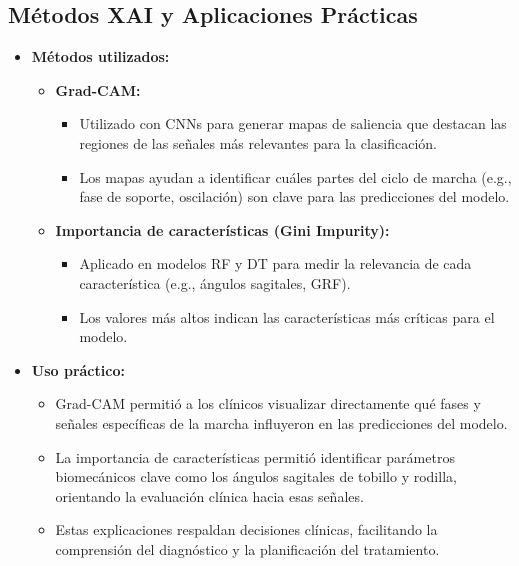 \documentclass{report}
\begin{document}
\subsection{Métodos XAI y Aplicaciones Prácticas}
\begin{itemize}
    \item \textbf{Métodos utilizados:}
    \begin{itemize}
        \item \textbf{Grad-CAM:}
        \begin{itemize}
            \item Utilizado con CNNs para generar mapas de saliencia que destacan las regiones de las señales más relevantes para la clasificación.
            \item Los mapas ayudan a identificar cuáles partes del ciclo de marcha (e.g., fase de soporte, oscilación) son clave para las predicciones del modelo.
        \end{itemize}
        \item \textbf{Importancia de características (Gini Impurity):}
        \begin{itemize}
            \item Aplicado en modelos RF y DT para medir la relevancia de cada característica (e.g., ángulos sagitales, GRF).
            \item Los valores más altos indican las características más críticas para el modelo.
        \end{itemize}
    \end{itemize}
    \item \textbf{Uso práctico:}
    \begin{itemize}
        \item Grad-CAM permitió a los clínicos visualizar directamente qué fases y señales específicas de la marcha influyeron en las predicciones del modelo.
        \item La importancia de características permitió identificar parámetros biomecánicos clave como los ángulos sagitales de tobillo y rodilla, orientando la evaluación clínica hacia esas señales.
        \item Estas explicaciones respaldan decisiones clínicas, facilitando la comprensión del diagnóstico y la planificación del tratamiento.
    \end{itemize}
\end{itemize}
\end{document}
